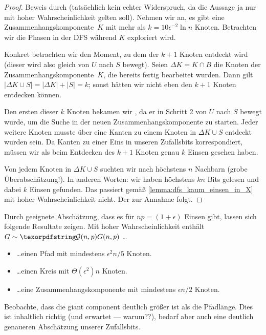 \begin{proof}
    Beweis durch  (tatsächlich kein echter Widerspruch, da die Aussage ja nur mit hoher Wahrscheinlichkeit gelten soll).
    Nehmen wir an, es gibt eine Zusammenhangskomponente~$K$ mit mehr als $k = 10 \epsilon^{-2} \ln n$ Knoten.
    Betrachten wir die Phasen in der DFS während $K$ exploriert wird.

    Konkret betrachten wir den Moment, zu dem der $k+1$ Knoten entdeckt wird (dieser wird also gleich von $U$ nach $S$ bewegt).
    Seien $\Delta K = K \cap B$ die Knoten der Zusammenhangskomponente~$K$, die bereits fertig bearbeitet wurden.
    Dann gilt $|\Delta K \cup S| = |\Delta K| + |S| = k$; sonst hätten wir nicht eben den $k+1$ Knoten entdecken können.

    Den ersten dieser $k$ Knoten bekamen wir , da er in Schritt 2 von $U$ nach $S$ bewegt wurde, um die Suche in der neuen Zusammenhangskomponente zu starten.
    Jeder weitere Knoten musste über eine Kanten zu einem Knoten in $\Delta K \cup S$ entdeckt wurden sein.
    Da Kanten zu einer Eins in unseren Zufallsbits korrespondiert, müssen wir als beim Entdecken des $k+1$ Knoten genau $k$ Einsen gesehen haben.

    Von jedem Knoten in $\Delta K \cup S$ suchten wir nach höchstens $n$ Nachbarn (grobe Überabschätzung!).
    In anderen Worten: wir haben höchstens $k n$ Bits gelesen und dabei $k$ Einsen gefunden.
    Das passiert gemäß \cref{lemma:dfs_kaum_einsen_in_X} mit hoher Wahrscheinlichkeit nicht.
    Der  zur Annahme folgt.
\end{proof}

Durch geeignete Abschätzung, dass es für $np = (1 + \epsilon)$  Einsen gibt, lassen sich folgende Resultate zeigen.
Mit hoher Wahrscheinlichkeit enthält $G \sim \Gnp$ \ldots
\begin{itemize}
    \item \ldots einen Pfad mit mindestens $\epsilon^2 n / 5$ Knoten.
    \item \ldots einen Kreis mit $\Theta(\epsilon^2) n$ Knoten.
    \item \ldots eine Zusammenhangskomponente mit mindestens $\epsilon n / 2$ Knoten.
\end{itemize}

Beobachte, dass die giant component deutlich größer ist als die Pfadlänge.
Dies ist inhaltlich richtig (und erwartet --- warum??), bedarf aber auch eine deutlich genaueren Abschätzung unserer Zufallsbits.

